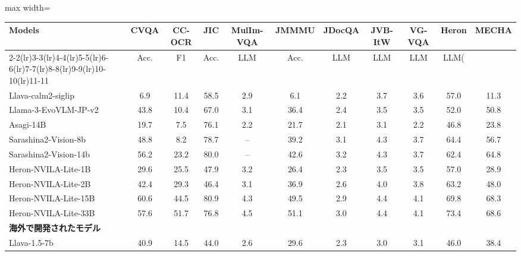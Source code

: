 \begingroup
\setlength{\tabcolsep}{2pt}
\renewcommand{\arraystretch}{0.9}
\begin{table*}[t]
\centering
\footnotesize
\caption{競争力のある視覚言語モデルの\methodName を用いた\textbf{日本語タスク}での評価例．
``--''は評価データセットを学習に用いているためスコアが算出できないことを示す．\textbf{太字}は最も高い結果．\underline{下線}は二番目に高い結果を示している．}
\vspace{.2em}
\begin{adjustbox}{max width=\linewidth}
\begin{tabular}{lcccccccccc}
\toprule
\multirow{2}{*}{\textbf{Models}} & \textbf{CVQA} & \textbf{CC-OCR} & \textbf{JIC} & \textbf{MulIm-VQA} & \textbf{JMMMU} & \textbf{JDocQA} & \textbf{JVB-ItW} & \textbf{VG-VQA} & \textbf{Heron} & \textbf{MECHA}\\
\cmidrule(lr){2-2}\cmidrule(lr){3-3}\cmidrule(lr){4-4}\cmidrule(lr){5-5}\cmidrule(lr){6-6}\cmidrule(lr){7-7}\cmidrule(lr){8-8}\cmidrule(lr){9-9}\cmidrule(lr){10-10}\cmidrule(lr){11-11}
 & Acc. & F1 & Acc. & LLM & Acc. & LLM & LLM & LLM & LLM(%
\midrule
\multicolumn{11}{l}{\textbf{日本国内で開発されたモデル}} \\
\midrule
Llava-calm2-siglip & 6.9 & 11.4 & 58.5 & 2.9 & 6.1 & 2.2 & 3.7 & 3.6 & 57.0 & 11.3 \\
Llama-3-EvoVLM-JP-v2 & 43.8 & 10.4 & 67.0 & 3.1 & 36.4 & 2.4 & 3.5 & 3.5 & 52.0 & 50.8 \\
Asagi-14B & 19.7 & 7.5 & 76.1 & 2.2 & 21.7 & 2.1 & 3.1 & 2.2 & 46.8 & 23.8 \\
Sarashina2-Vision-8b & 48.8 & 8.2 & 78.7 & -- & 39.2 & 3.1 & 4.3 & 3.7 & 64.4 & 56.7 \\
Sarashina2-Vision-14b & 56.2 & 23.2 & 80.0 & -- & 42.6 & 3.2 & 4.3 & 3.7 & 62.4 & 64.8 \\
Heron-NVILA-Lite-1B & 29.6 & 25.5 & 47.9 & 3.2 & 26.4 & 2.3 & 3.5 & 3.5 & 57.0 & 28.9 \\
Heron-NVILA-Lite-2B & 42.4 & 29.3 & 46.4 & 3.1 & 36.9 & 2.6 & 4.0 & 3.8 & 63.2 & 48.0 \\
Heron-NVILA-Lite-15B & 60.6 & 44.5 & 80.9 & 4.3 & 49.5 & 2.9 & 4.4 & 4.1 & 69.8 & 68.3 \\
Heron-NVILA-Lite-33B & 57.6 & 51.7 & 76.8 & 4.5 & 51.1 & 3.0 & 4.4 & 4.1 & 73.4 & 68.6 \\
\midrule
\multicolumn{11}{l}{\textbf{海外で開発されたモデル}} \\
\midrule
Llava-1.5-7b & 40.9 & 14.5 & 44.0 & 2.6 & 29.6 & 2.3 & 3.0 & 3.1 & 46.0 & 38.4 \\

\end{tabular}
\end{adjustbox}
\end{table*}
